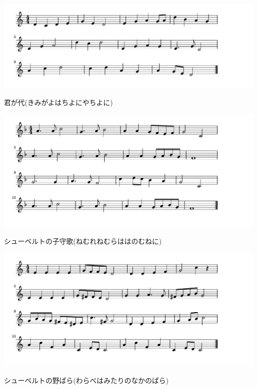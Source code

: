 \documentclass[a4paper]{ltjsarticle}
\begin{document}
\includegraphics[clip]{kimigayo_crop.pdf}

\vspace{-10mm} \hspace{10mm}
君が代(きみがよはちよにやちよに)

\includegraphics[clip]{schubertkomori_crop.pdf}

\vspace{-10mm} \hspace{10mm}
シューベルトの子守歌(ねむれねむらははのむねに)

\includegraphics[clip]{schubertnobara_crop.pdf}

\vspace{-10mm} \hspace{10mm}
シューベルトの野ばら(わらべはみたりのなかのばら)
\end{document}
